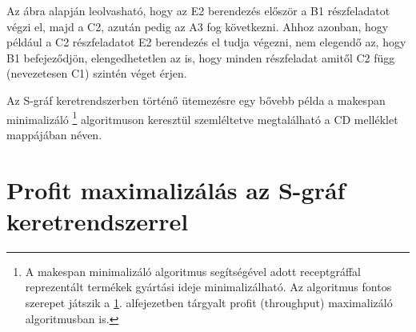 Az ábra alapján leolvasható, hogy az E2 berendezés először a B1 részfeladatot végzi el, majd a C2, azután pedig az A3 fog következni.
Ahhoz azonban, hogy például a C2 részfeladatot E2 berendezés el tudja végezni, nem elegendő az, hogy B1 befejeződjön, elengedhetetlen az is, hogy minden részfeladat amitől C2 függ (nevezetesen C1) szintén véget érjen.

Az S-gráf keretrendszerben történő ütemezésre egy bővebb példa a makespan minimalizáló \footnote{A makespan minimalizáló algoritmus segítségével adott receptgráffal reprezentált termékek gyártási ideje minimalizálható. Az algoritmus fontos szerepet játszik a \ref{SgraphProfitMax}. alfejezetben tárgyalt profit (throughput) maximalizáló algoritmusban is.} algoritmuson keresztül szemléltetve megtalálható a CD melléklet  mappájában  néven. 
\section{Profit maximalizálás az S-gráf keretrendszerrel} \label{SgraphProfitMax}
